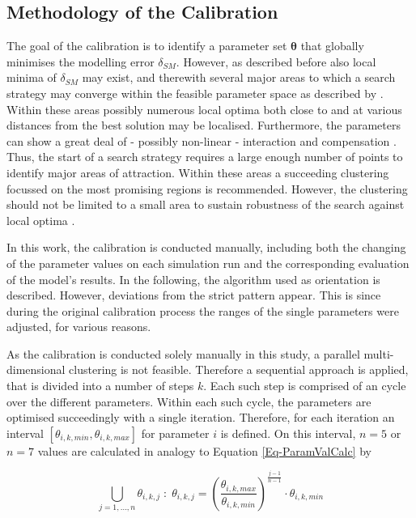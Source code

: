 \subsection{Methodology of the Calibration}
\label{Sec-SubMethCal}

The goal of the calibration is to identify a parameter set $\bm{\theta}$ that globally minimises the modelling error $\delta_{SM}$. However, as described before also local minima of $\delta_{SM}$ may exist, and therewith several major areas to which a search strategy may converge within the feasible parameter space as described by \textcite{Duan.1993}. Within these areas possibly numerous local optima both close to and at various distances from the best solution may be localised. Furthermore, the parameters can show a great deal of - possibly non-linear - interaction and compensation \parencite{Duan.1993}. Thus, the start of a search strategy requires a large enough number of points to identify major areas of attraction. Within these areas a succeeding clustering focussed on the most promising regions is recommended. However, the clustering should not be limited to a small area to sustain robustness of the search against local optima \parencite{Duan.1993}.

In this work, the calibration is conducted manually, including both the changing of the parameter values on each simulation run and the corresponding evaluation of the model's results. In the following, the algorithm used as orientation is described. However, deviations from the strict pattern appear. This is since during the original calibration process the ranges of the single parameters were adjusted, for various reasons.

As the calibration is conducted solely manually in this study, a parallel multi-dimensional clustering is not feasible. Therefore a sequential approach is applied, that is divided into a number of steps $k$. Each such step is comprised of an cycle over the different parameters. Within each such cycle, the parameters are optimised succeedingly with a single iteration. Therefore, for each iteration an interval $[\theta_{i,k,min}, \theta_{i,k,max}]$ for parameter $i$ is defined. On this interval, $n=5$ or $n=7$ values are calculated in analogy to Equation \eqref{Eq-ParamValCalc} by

\begin{equation}
    \label{Eq-ParamValCalcCalib}
    \bigcup_{j=1,...,n} \theta_{i,k,j} \; : \; \theta_{i,k,j} = \left( \frac{\theta_{i,k,max}}{\theta_{i,k,min}} \right) ^{\frac{j-1}{n-1}} \cdot \theta_{i,k,min}
\end{equation}

